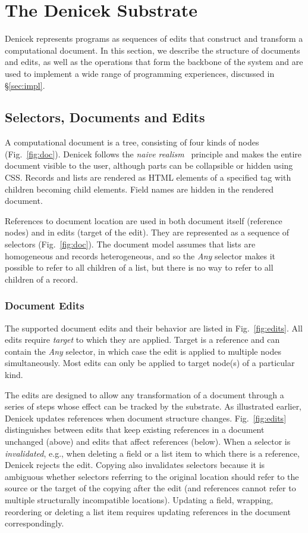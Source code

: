 \documentclass[sigconf]{acmart}
\begin{document}

\section{The Denicek Substrate}
\label{sec:system}
Denicek represents programs as sequences of edits that construct and transform a computational
document. In this section, we describe the structure of documents and edits, as well as the
operations that form the backbone of the system and are used to implement a wide range of
programming experiences, discussed in \S\ref{sec:impl}.

\subsection{Selectors, Documents and Edits}
A computational document is a tree, consisting of four kinds of nodes (Fig.~\ref{fig:doc}).
Denicek follows the \emph{naive realism}~\cite{disessa-1986-boxer} principle and makes the entire
document visible to the user, although parts can be collapsible or hidden using CSS.
Records and lists are rendered as HTML elements of a specified tag with children becoming child
elements. Field names are hidden in the rendered document.

References to document location are used in both document itself (reference nodes) and in edits
(target of the edit). They are represented as a sequence of selectors (Fig.~\ref{fig:doc}).
The document model assumes that lists are homogeneous and records heterogeneous, and so the
\textit{Any} selector makes it possible to refer to all children of a list, but there is no
way to refer to all children of a record.

\subsubsection*{Document Edits}
The supported document edits and their behavior are listed in Fig.~\ref{fig:edits}. All edits
require \emph{target} to which they are applied. Target is a reference and can contain the
\textit{Any} selector, in which case the edit is applied to multiple nodes simultaneously.
Most edits can only be applied to target node(s) of a particular kind.

The edits are designed to allow any transformation of a document
through a series of steps whose effect can be tracked by the substrate. As illustrated earlier,
Denicek updates references when document structure changes. Fig.~\ref{fig:edits} distinguishes
between edits that keep existing references in a document unchanged (above) and edits that affect
references (below). When a selector is \emph{invalidated}, e.g., when deleting a field or a
list item to which there is a reference, Denicek rejects the edit. Copying also invalidates
selectors because it is ambiguous whether selectors referring to the original location should
refer to the source or the target of the copying after the edit (and references cannot refer to
multiple structurally incompatible locations). Updating a field, wrapping, reordering or deleting
a list item requires updating references in the document correspondingly.
\end{document}
